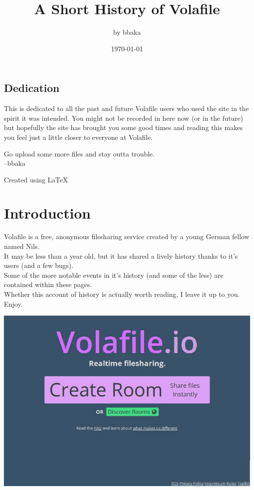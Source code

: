 \documentclass[12pt]{report}
\begin{document}
\setcounter{secnumdepth}{2}
{


\title{A Short History of Volafile}
\author{by bbaka\footnotemark}
\date{\today}
\maketitle
\tableofcontents
\pagebreak


\vfill
\section*{Dedication}
\parbox{\textwidth}{This is dedicated to all the past and future Volafile users who used the site in the spirit it was intended. You might not be recorded in here now (or in the future) but hopefully the site has brought you some good times and reading this makes you feel just a little closer to everyone at Volafile. \\ 
	\raggedright Go upload some more files and stay outta trouble.\\
		\raggedleft 
	--bbaka\\
}

\vfill

{ 
	\centering Created using \LaTeX 
}

\pagebreak

\chapter*{Introduction}
	Volafile is a free, anonymous filesharing service created by a young German fellow named Nils.\\
	It may be less than a year old, but it has shared a lively history thanks to it's users (and a few bugs). \\
	Some of the more notable events in it's history (and some of the less) are contained within these pages.\\
	Whether this account of history is actually worth reading, I leave it up to you.\\ 
Enjoy.

\begin{image}
	\centering
	\includegraphics[scale=0.45]{Volafile.jpg}
\end{image}

}
\end{document}
